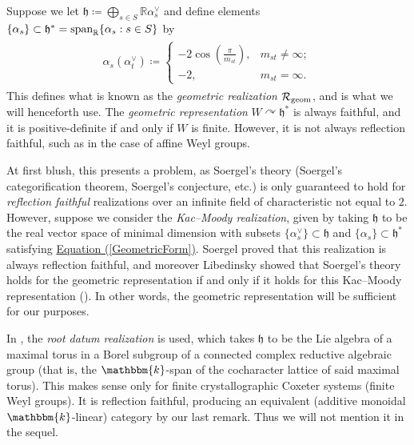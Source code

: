 \noindent Suppose we let $\mathfrak{h} \coloneqq \bigoplus_{s \in S} \mathbb{R}\alpha_s^\vee$ and define elements $\{\alpha_s\} \subset \mathfrak{h}^* = \textup{span}_\mathbb{R}\{\alpha_s : s \in S\}$ by
\begin{align}
\begin{split}
\label{GeometricForm}\alpha_s(\alpha_t^\vee) \coloneqq \begin{cases}-2\cos\!\left(\frac{\pi}{m_{st}}\right)\!,&m_{st} \neq \infty;\\-2,&m_{st} = \infty.\end{cases}
\end{split}
\end{align}
\noindent This defines what is known as the {\em geometric realization} $\mathcal{R}_\textup{geom}$, and is what we will henceforth use. The {\em geometric representation} $W \curvearrowright \mathfrak{h}^*$ is always faithful, and it is positive-definite if and only if $W$ is finite. However, it is not always reflection faithful, such as in the case of affine Weyl groups.\\

\noindent\begin{remark} At first blush, this presents a problem, as Soergel's theory (Soergel's categorification theorem, Soergel's conjecture, etc.) is only guaranteed to hold for {\em reflection faithful} realizations over an infinite field of characteristic not equal to $2$. However, suppose we consider the {\em Kac--Moody realization}, given by taking $\mathfrak{h}$ to be the real vector space of minimal dimension with subsets $\{\alpha_s^\vee\} \subset \mathfrak{h}$ and $\{\alpha_s\} \subset \mathfrak{h}^*$ satisfying \hyperref[GeometricForm]{Equation (\ref*{GeometricForm})}. Soergel proved that this realization is always reflection faithful, and moreover Libedinsky showed that Soergel's theory holds for the geometric representation if and only if it holds for this Kac--Moody representation (\cite[\S 5.6]{EMTW20}). In other words, the geometric representation will be sufficient for our purposes.
\end{remark}
\newpage

\noindent\begin{remark} In \cite{LR22}, the {\em root datum realization} is used, which takes $\mathfrak{h}$ to be the Lie algebra of a maximal torus in a Borel subgroup of a connected complex reductive algebraic group (that is, the $\mathbbm{k}$-span of the cocharacter lattice of said maximal torus). This makes sense only for finite crystallographic Coxeter systems (finite Weyl groups).\! It is reflection faithful, producing an equivalent (additive monoidal $\mathbbm{k}$-linear) category by our last remark. Thus we will not mention it in the sequel.\\
\end{remark}


